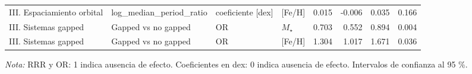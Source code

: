 \begin{table}[htbp]
{\begin{tabular}{llllrrrr}
    III. Espaciamiento orbital & log\_median\_period\_ratio & coeficiente [dex] & {[Fe/H]} & 0.015 & -0.006 & 0.035 & 0.166 \\
    III. Sistemas gapped & Gapped vs no gapped & OR & $M_\star$ & 0.703 & 0.552 & 0.894 & 0.004 \\
    III. Sistemas gapped & Gapped vs no gapped & OR & {[Fe/H]} & 1.304 & 1.017 & 1.671 & 0.036 \\
    \bottomrule
    \end{tabular}
    }
    \par\smallskip
    {\footnotesize\textit{Nota:} RRR y OR: 1 indica ausencia de efecto. Coeficientes en dex: 0 indica ausencia de efecto. Intervalos de confianza al 95 \%.}
\end{table}
